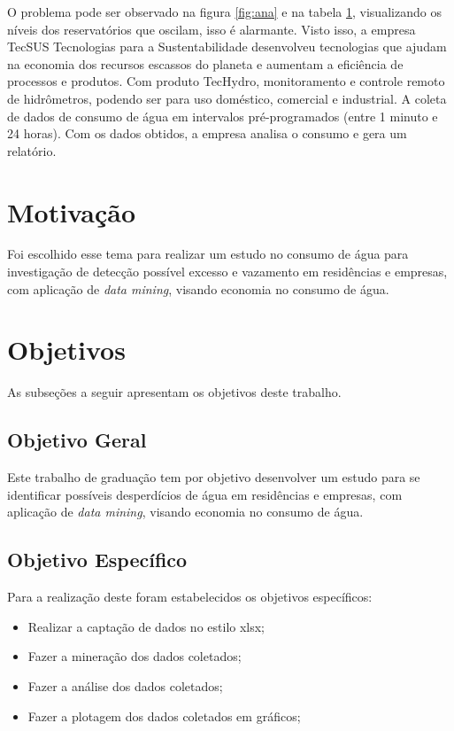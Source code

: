 \begin{table}[ht]
\begin{tabular}{|c|c|c|c|c|c|}
\end{tabular}
\label{table:table_ana}
\end{table}
  	
 
\par O problema pode ser observado na figura \ref{fig:ana} e na tabela \ref{table:table_ana}, visualizando os níveis dos reservatórios que oscilam, isso é alarmante. Visto isso, a empresa TecSUS Tecnologias para a Sustentabilidade desenvolveu tecnologias que ajudam na economia dos recursos escassos do planeta e aumentam a eficiência de processos e produtos. Com produto TecHydro, monitoramento e controle remoto de hidrômetros, podendo ser para uso doméstico, comercial e industrial. A coleta de dados de consumo de água em intervalos pré-programados (entre 1 minuto e 24 horas). Com os dados obtidos, a empresa analisa o consumo e gera um relatório.

\par 


\section{Motivação}
\par Foi escolhido esse tema para realizar um estudo no consumo de água para investigação de detecção possível excesso e vazamento em residências e empresas, com aplicação de \emph{data mining}, visando economia no consumo de água.
\section{Objetivos}
\par As subseções a seguir apresentam os objetivos deste trabalho.
\subsection{ Objetivo Geral}
\par Este trabalho de graduação tem por objetivo desenvolver um estudo para se identificar possíveis desperdícios de água em residências e empresas, com aplicação de \emph{data mining}, visando economia no consumo de água.
\subsection{Objetivo Específico}
\par Para a realização deste  foram estabelecidos os objetivos específicos:
\begin{itemize}
	\item Realizar a captação de dados no estilo xlsx;
	\item Fazer a mineração dos dados coletados;
	\item Fazer a análise dos dados coletados;
	\item Fazer a plotagem dos dados coletados em gráficos;
\end{itemize}

